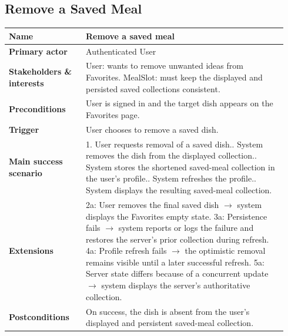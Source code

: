 \documentclass[sigconf]{acmart}
\begin{document}
\subsection*{Remove a Saved Meal}
{\footnotesize
\begin{supertabular}{@{}p{0.26\linewidth}p{0.68\linewidth}@{}}
\textbf{Name} & Remove a saved meal \\
\hline
\textbf{Primary actor} & Authenticated User \\
\hline
\textbf{Stakeholders \& interests} & User: wants to remove unwanted ideas from Favorites. MealSlot: must keep the displayed and persisted saved collections consistent. \\
\hline
\textbf{Preconditions} & User is signed in and the target dish appears on the Favorites page. \\
\hline
\textbf{Trigger} & User chooses to remove a saved dish. \\
\hline
\textbf{Main success scenario} & 1. User requests removal of a saved dish.. System removes the dish from the displayed collection.. System stores the shortened saved-meal collection in the user's profile.. System refreshes the profile.. System displays the resulting saved-meal collection. \\
\hline
\textbf{Extensions} & 2a: User removes the final saved dish $\rightarrow$ system displays the Favorites empty state.\newline
3a: Persistence fails $\rightarrow$ system reports or logs the failure and restores the server's prior collection during refresh.\newline
4a: Profile refresh fails $\rightarrow$ the optimistic removal remains visible until a later successful refresh.\newline
5a: Server state differs because of a concurrent update $\rightarrow$ system displays the server's authoritative collection. \\
\hline
\textbf{Postconditions} & On success, the dish is absent from the user's displayed and persistent saved-meal collection. \\
\end{supertabular}
}
\end{document}
